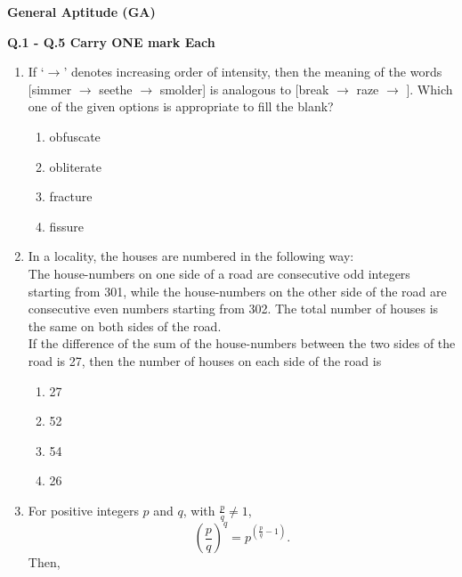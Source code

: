 \documentclass[journal,12pt,onecolumn]{exam}
\theoremstyle{remark}
\begin{document}
\vspace{0.5em}

\textbf{General Aptitude (GA)}

\vspace{0.5em}

\textbf{Q.1 - Q.5 Carry ONE mark Each }

\begin{enumerate}

    \item If `$\rightarrow$' denotes increasing order of intensity, then the meaning of the words [simmer $\rightarrow$ seethe $\rightarrow$ smolder] is analogous to [break $\rightarrow$ raze $\rightarrow$ \underline{\hspace{2cm}}]. Which one of the given options is appropriate to fill the blank?
    
    \begin{enumerate}[label=\alph*)]
        \item obfuscate
        \item obliterate
        \item fracture
        \item fissure
    \end{enumerate}

\item In a locality, the houses are numbered in the following way: \\
    The house-numbers on one side of a road are consecutive odd integers starting from 301, while the house-numbers on the other side of the road are consecutive even numbers starting from 302. The total number of houses is the same on both sides of the road. \\
    If the difference of the sum of the house-numbers between the two sides of the road is 27, then the number of houses on each side of the road is
    
    \begin{enumerate}[label=\alph*)]
        \item 27
        \item 52
        \item 54
        \item 26
    \end{enumerate}
    
    \item For positive integers $p$ and $q$, with $\frac{p}{q} \neq 1$, 
    \[
    \left(\frac{p}{q}\right)^q = p^{\left(\frac{p}{q} - 1\right)}.
    \]
    Then,
    

\end{enumerate}
\end{document}
